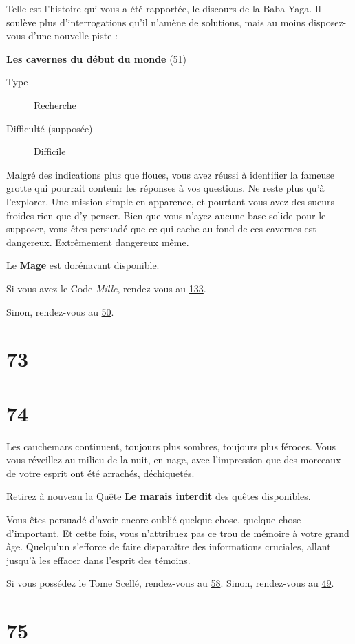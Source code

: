 \documentclass{report}
\newcommand{\gsection}[1]{
    \section{#1}
    \label{section-#1}
}
\newcommand{\glink}[1]{\hyperref[section-#1]{#1}}
\newcommand{\quest}[5]{
    \begin{mdframed}[innertopmargin=0.5cm,innerbottommargin=0.5cm]
        \begin{center}
            \textbf{#1} (#2)
        \end{center}
        \begin{description}
            \item[Type] #3
            \item[Difficulté (supposée)] #4
        \end{description}
        #5
    \end{mdframed}
}
\newcommand{\hero}[1]{
    \textbf{#1}
}
\begin{document}
Telle est l'histoire qui vous a été rapportée, le discours de la Baba Yaga. Il soulève plus d'interrogations qu'il n'amène de solutions, mais au moins disposez-vous d'une nouvelle piste :

\quest{Les cavernes du début du monde}{51}{Recherche}{Difficile}{
Malgré des indications plus que floues, vous avez réussi à identifier la fameuse grotte qui pourrait contenir les réponses à vos questions. Ne reste plus qu'à l'explorer. Une mission simple en apparence, et pourtant vous avez des sueurs froides rien que d'y penser. Bien que vous n'ayez aucune base solide pour le supposer, vous êtes persuadé que ce qui cache au fond de ces cavernes est dangereux. Extrêmement dangereux même.
}

Le \hero{Mage} est dorénavant disponible.

Si vous avez le Code \emph{Mille}, rendez-vous au \glink{133}.

Sinon, rendez-vous au \glink{50}.

\gsection{73}

\gsection{74}

Les cauchemars continuent, toujours plus sombres, toujours plus féroces. Vous vous réveillez au milieu de la nuit, en nage, avec l'impression que des morceaux de votre esprit ont été arrachés, déchiquetés.

Retirez à nouveau la Quête \textbf{Le marais interdit} des quêtes disponibles.

Vous êtes persuadé d'avoir encore oublié quelque chose, quelque chose d'important. Et cette fois, vous n'attribuez pas ce trou de mémoire à votre grand âge. Quelqu'un s'efforce de faire disparaître des informations cruciales, allant jusqu'à les effacer dans l'esprit des témoins.

Si vous possédez le Tome Scellé, rendez-vous au \glink{58}. Sinon, rendez-vous au \glink{49}.

\gsection{75}
\end{document}
